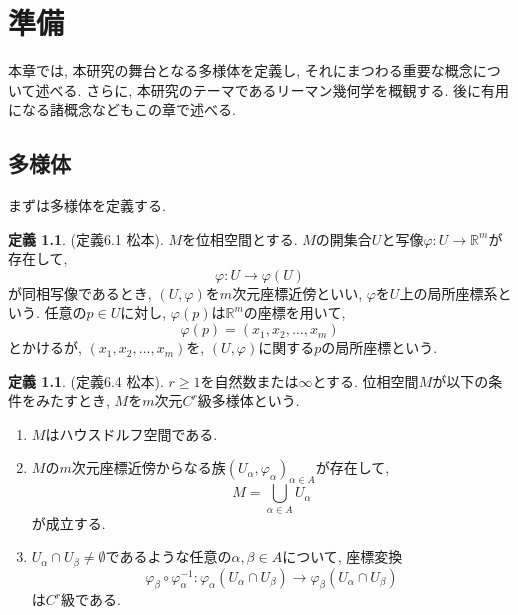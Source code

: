 \documentclass[uplatex]{suribt}
\theoremstyle{definition}
\newtheorem{definition}[theorem]{定義}
\begin{document}
\chapter{準備}

本章では, 本研究の舞台となる多様体を定義し, それにまつわる重要な概念について述べる. さらに, 本研究のテーマであるリーマン幾何学を概観する. 後に有用になる諸概念などもこの章で述べる.

\section{多様体}
まずは多様体を定義する.
\begin{definition}
(定義6.1 松本). \(M\)を位相空間とする. \(M\)の開集合\(U\)と写像\(\varphi:U \to \mathbb{R}^m\)が存在して,
\begin{equation*}
    \varphi:U \to \varphi(U)
\end{equation*}
が同相写像であるとき, \((U,\varphi)\)を\(m\)次元座標近傍といい, \(\varphi\)を\(U\)上の局所座標系という. 任意の\(p \in U\)に対し, \(\varphi(p)\)は\(\mathbb{R}^m\)の座標を用いて,
\begin{equation*}
    \varphi(p) = (x_1,x_2,\ldots,x_m)
\end{equation*}
とかけるが, \((x_1,x_2,\ldots,x_m)\)を, \((U,\varphi)\)に関する\(p\)の局所座標という.
\end{definition}

\begin{definition}
(定義6.4 松本). \(r \ge 1\)を自然数または\(\infty\)とする. 位相空間\(M\)が以下の条件をみたすとき, \(M\)を\(m\)次元\(C^r\)級多様体という.
\begin{enumerate}
    \item \(M\)はハウスドルフ空間である.
    \item \(M\)の\(m\)次元座標近傍からなる族\({(U_\alpha,\varphi_\alpha)}_{\alpha \in A}\)が存在して,
        \begin{equation*}
            M = \bigcup_{\alpha \in A}U_\alpha
        \end{equation*}
    が成立する.
    \item \(U_\alpha \cap U_\beta \neq \emptyset\)であるような任意の\(\alpha,\beta \in A\)について, 座標変換
        \begin{equation*}
            \varphi_\beta \circ \varphi_{\alpha}^{-1}:\varphi_\alpha(U_\alpha \cap U_\beta) \to \varphi_\beta(U_\alpha \cap U_\beta)
        \end{equation*}
    は\(C^r\)級である.
\end{enumerate}
\end{definition}
\end{document}
